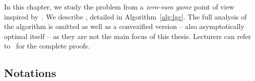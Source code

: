 




In this chapter, we study the problem from a \emph{zero-sum game} point of view inspired by~\cite{degenne2019pure}. We describe \LG{}, detailed in Algorithm~\ref{alg:lgc}. The full analysis of the algorithm is omitted as well as a convexified version \LGC{} -- also asymptotically optimal itself -- as they are not the main focus of this thesis. Lecturers can refer to~\cite{degenne2020game} for the complete proofs.

\subsection{Notations}
